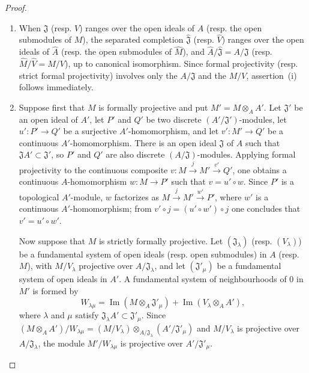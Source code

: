 \begin{proof}
\begin{enumerate}
  \item[(i)] When $\mathfrak J$ (resp. $V$) ranges over the open ideals of $A$ (resp. the open submodules of $M$), the separated completion $\widehat{\mathfrak J}$ (resp. $\widehat V$) ranges over the open ideals of $\widehat A$ (resp. the open submodules of $\widehat M$), and $\widehat A/\widehat{\mathfrak J}=A/\mathfrak J$ (resp. $\widehat M/\widehat V=M/V$), up to canonical isomorphism.
  Since formal projectivity (resp. strict formal projectivity) involves only the $A/\mathfrak J$ and the $M/V$, assertion~(i) follows immediately.

  \item[(ii)] Suppose first that $M$ is formally projective and put $M'=M\otimes_A A'$.
  Let $\mathfrak J'$ be an open ideal of $A'$, let $P'$ and $Q'$ be two discrete $(A'/\mathfrak J')$-modules, let $u':P'\to Q'$ be a surjective $A'$-homomorphism, and let $v':M'\to Q'$ be a continuous $A'$-homomorphism.
  There is an open ideal $\mathfrak J$ of $A$ such that $\mathfrak JA'\subset\mathfrak J'$, so $P'$ and $Q'$ are also discrete $(A/\mathfrak J)$-modules.
  Applying formal projectivity to the continuous composite $v:M\xrightarrow{j}M'\xrightarrow{v'}Q'$, one obtains a continuous $A$-homomorphism $w:M\to P'$ such that $v=u'\circ w$.
  Since $P'$ is a topological $A'$-module, $w$ factorizes as $M\xrightarrow{j}M'\xrightarrow{w'}P'$, where $w'$ is a continuous $A'$-homomorphism; from $v'\circ j=(u'\circ w')\circ j$ one concludes that $v'=u'\circ w'$.

  Now suppose that $M$ is strictly formally projective.
  Let $(\mathfrak J_\lambda)$ (resp. $(V_\lambda)$) be a fundamental system of open ideals (resp. open submodules) in $A$ (resp. $M$), with $M/V_\lambda$ projective over $A/\mathfrak J_\lambda$, and let $(\mathfrak J'_\mu)$ be a fundamental system of open ideals in $A'$.
  A fundamental system of neighbourhoods of $0$ in $M'$ is formed by
  \[
    W_{\lambda\mu}=\operatorname{Im}(M\otimes_A\mathfrak J'_\mu)+\operatorname{Im}(V_\lambda\otimes_A A'),
  \]
  where $\lambda$ and $\mu$ satisfy $\mathfrak J_\lambda A'\subset\mathfrak J'_\mu$.
  Since $(M\otimes_A A')/W_{\lambda\mu}
    =(M/V_\lambda)\otimes_{A/\mathfrak J_\lambda}
      (A'/\mathfrak J'_\mu)$
  and $M/V_\lambda$ is projective over $A/\mathfrak J_\lambda$, the module $M'/W_{\lambda\mu}$ is projective over $A'/\mathfrak J'_\mu$.
\end{enumerate}
\end{proof}

